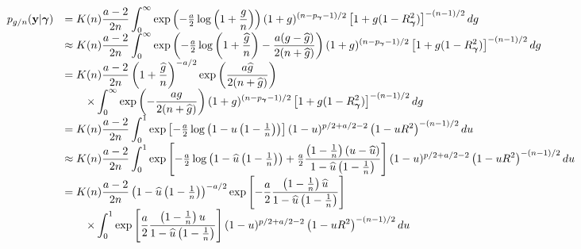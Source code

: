 \documentclass{article}[12pt]
\begin{document}
$$
\begin{array}{rl}
p_{g/n}({\bf y}|{\boldsymbol \gamma}) 
& \displaystyle = K(n) \frac{a - 2}{2n}  \int_0^\infty 
\exp\left( -\tfrac{a}{2} \log\left(1 + \frac{g}{n}\right) \right)
(1 + g)^{(n-p_{\boldsymbol \gamma}-1)/2} \left[ 1 + g (1 - R_{\boldsymbol \gamma}^2) \right]^{-(n-1)/2}  dg
\\
& \displaystyle \approx K(n) \frac{a - 2}{2n}  \int_0^\infty 
\exp\left( -\tfrac{a}{2} \log\left(1 + \frac{\widehat{g}}{n}\right) - \frac{a(g - \widehat{g})}{2(n + \widehat{g})} \right)
(1 + g)^{(n-p_{\boldsymbol \gamma}-1)/2} \left[ 1 + g (1 - R_{\boldsymbol \gamma}^2) \right]^{-(n-1)/2}  dg
\\
& \displaystyle = K(n) \frac{a - 2}{2n} \left( 1 + \frac{\widehat{g}}{n} \right)^{-a/2} \exp\left( \frac{a\widehat{g}}{2(n + \widehat{g})} \right) \\
& \displaystyle \qquad \times \int_0^\infty 
\exp\left(  - \frac{ag}{2(n + \widehat{g})} \right)
(1 + g)^{(n-p_{\boldsymbol \gamma}-1)/2} \left[ 1 + g (1 - R_{\boldsymbol \gamma}^2) \right]^{-(n-1)/2}  dg
\\
& \displaystyle = K(n) \frac{a - 2}{2n}  \int_0^1 \exp\left[
- \tfrac{a}{2}\log\left(  1 - u \left(1  -  \tfrac{1}{n} \right) \right)
\right]
(1 - u)^{p/2 + a/2 - 2  }   \left(  1 - u R^2\right)^{-(n-1)/2} du
\\
& \displaystyle \approx K(n) \frac{a - 2}{2n}  \int_0^1 \exp\left[
- \tfrac{a}{2}\log\left(  1 - \widehat{u} \left(1  -  \tfrac{1}{n} \right)  \right) + \tfrac{a}{2} \frac{\left(1  -  \tfrac{1}{n} \right)(u - \widehat{u})}{1 - \widehat{u} \left(1  -  \tfrac{1}{n} \right)}
\right]
(1 - u)^{p/2 + a/2 - 2  }   \left(  1 - u R^2\right)^{-(n-1)/2} du
\\
& \displaystyle = K(n) \frac{a - 2}{2n} \left(  1 - \widehat{u} \left(1  -  \tfrac{1}{n} \right)  \right)^{-a/2} 
\exp\left[
-\frac{a}{2} \frac{\left(1  -  \tfrac{1}{n} \right)\widehat{u}}{1 - \widehat{u} \left(1  -  \tfrac{1}{n} \right)}
\right]\\
& \displaystyle \qquad \times \int_0^1 \exp\left[
\frac{a}{2} \frac{\left(1  -  \tfrac{1}{n} \right)u}{1 - \widehat{u} \left(1  -  \tfrac{1}{n} \right)}
\right]
(1 - u)^{p/2 + a/2 - 2  }   \left(  1 - u R^2\right)^{-(n-1)/2} du
\end{array} 
$$
\end{document}
